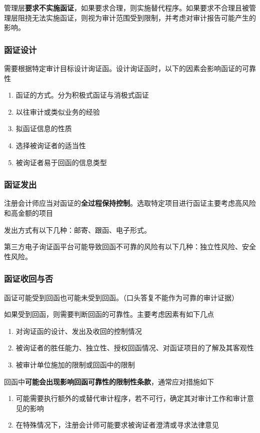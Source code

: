 \documentclass[UTF8,12pt]{ctexart}
\numberwithin{equation}{section} %
\numberwithin{figure}{section}
\numberwithin{table}{section}
\begin{document}
	管理层\textbf{要求不实施函证}，如果要求合理，则实施替代程序。如果要求不合理且被管理层阻挠无法实施函证，则视为审计范围受到限制，并考虑对审计报告可能产生的影响。
	
	\subsubsection{函证设计}
	需要根据特定审计目标设计询证函。设计询证函时，以下的因素会影响函证的可靠性
	\begin{enumerate}
		\item 函证的方式。分为积极式函证与消极式函证
		
		\item 以往审计或类似业务的经验
		
		\item 拟函证信息的性质
		
		\item 选择被询证者的适当性
		
		\item 被询证者易于回函的信息类型
	\end{enumerate}
	
	\subsubsection{函证发出}
	注册会计师应当对函证的\textbf{全过程保持控制}。选取特定项目进行函证主要考虑高风险和高金额的项目
	
	发出方式有以下几种：邮寄、跟函、电子形式。
	
	第三方电子询证函平台可能导致回函不可靠的风险有以下几种：独立性风险、安全性风险。
	
	\subsubsection{函证收回与否}
	函证可能受到回函也可能未受到回函。（口头答复不能作为可靠的审计证据）
	
	如果受到回函，则需要判断回函的可靠性。主要考虑因素有如下几点
	\begin{enumerate}
		\item 对询证函的设计、发出及收回的控制情况
		
		\item 被询证者的胜任能力、独立性、授权回函情况、对函证项目的了解及其客观性
		
		\item 被审计单位施加的限制或回函中的限制
	\end{enumerate}
	
	回函中\textbf{可能会出现影响回函可靠性的限制性条款}，通常应对措施如下
	\begin{enumerate}
		\item 可能需要执行额外的或替代审计程序，若不可行，确定其对审计工作和审计意见的影响
		
		\item 在特殊情况下，注册会计师可能要求被询证者澄清或寻求法律意见
	\end{enumerate}
	
\end{document}

